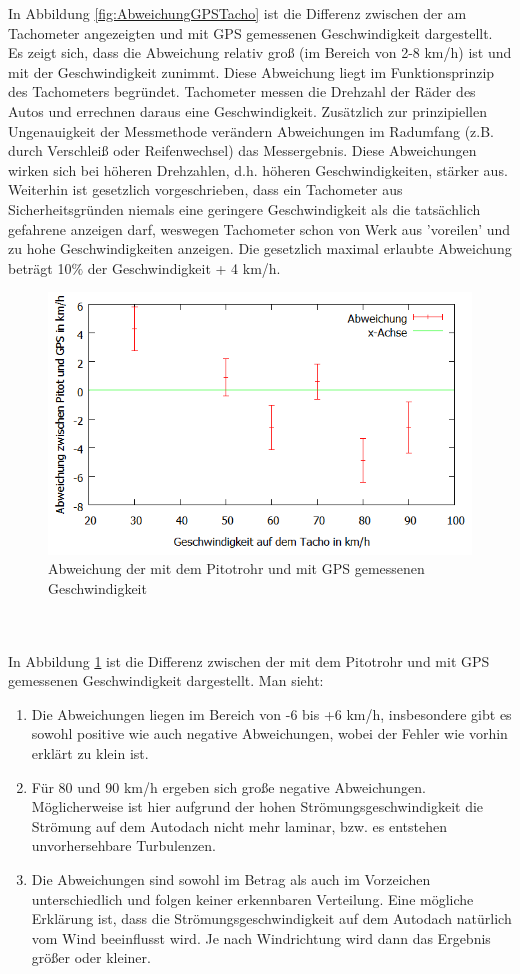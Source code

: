 In Abbildung \ref{fig:AbweichungGPSTacho} ist die Differenz zwischen der am Tachometer angezeigten und mit GPS gemessenen Geschwindigkeit dargestellt. Es zeigt sich, dass die Abweichung relativ groß (im Bereich von 2-8 km/h) ist und mit der Geschwindigkeit zunimmt. Diese Abweichung liegt im Funktionsprinzip des Tachometers begründet. Tachometer messen die Drehzahl der Räder des Autos und errechnen daraus eine Geschwindigkeit. Zusätzlich zur prinzipiellen Ungenauigkeit der Messmethode verändern Abweichungen im Radumfang (z.B. durch Verschleiß oder Reifenwechsel) das Messergebnis. Diese Abweichungen wirken sich bei höheren Drehzahlen, d.h. höheren Geschwindigkeiten, stärker aus. Weiterhin ist gesetzlich vorgeschrieben, dass ein Tachometer aus Sicherheitsgründen niemals eine geringere Geschwindigkeit als die tatsächlich gefahrene anzeigen darf, weswegen Tachometer schon von Werk aus 'voreilen' und zu hohe Geschwindigkeiten anzeigen. Die gesetzlich maximal erlaubte Abweichung beträgt 10$\%$ der Geschwindigkeit + 4 km/h.
\begin{figure}
      \includegraphics[width=.9\textwidth]{images/AbweichungGPSPitot}
\caption{Abweichung der mit dem Pitotrohr und mit GPS gemessenen Geschwindigkeit}
\label{fig:AbweichungGPSPitot}
\end{figure}
\\
\\
In Abbildung \ref{fig:AbweichungGPSPitot} ist die Differenz zwischen der mit dem Pitotrohr und mit GPS gemessenen Geschwindigkeit dargestellt. Man sieht:
\begin{enumerate}
\item Die Abweichungen liegen im Bereich von -6 bis +6 km/h, insbesondere gibt es sowohl positive wie auch negative Abweichungen, wobei der Fehler wie vorhin erklärt zu klein ist.
\item Für 80 und 90 km/h ergeben sich große negative Abweichungen. Möglicherweise ist hier aufgrund der hohen Strömungsgeschwindigkeit die Strömung auf dem Autodach nicht mehr laminar, bzw. es entstehen unvorhersehbare Turbulenzen.
\item Die Abweichungen sind sowohl im Betrag als auch im Vorzeichen unterschiedlich und folgen keiner erkennbaren Verteilung. Eine mögliche Erklärung ist, dass die Strömungsgeschwindigkeit auf dem Autodach natürlich vom Wind beeinflusst wird. Je nach Windrichtung wird dann das Ergebnis größer oder kleiner.
\end{enumerate}

